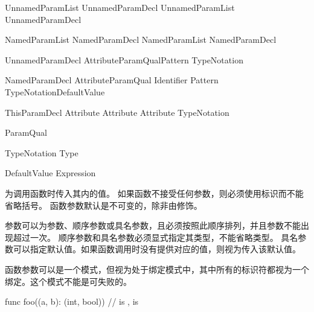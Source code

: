 \begin{bnf}{UnnamedParamList}
    UnnamedParamDecl \br
    UnnamedParamList \terminal{,} UnnamedParamDecl
\end{bnf}

\begin{bnf}{NamedParamList}
    NamedParamDecl \br
    NamedParamList \terminal{,} NamedParamDecl
\end{bnf}

\begin{bnf}{UnnamedParamDecl}
    Attribute\bnfs ParamQual\bnfq Pattern TypeNotation\bnfq
\end{bnf}

\begin{bnf}{NamedParamDecl}
    Attribute\bnfs ParamQual\bnfs \terminal{(} Identifier \terminal{)} Pattern TypeNotation\bnfq DefaultValue\bnfq
\end{bnf}

\begin{bnf}{ThisParamDecl}
    Attribute\bnfs {}\bnfq {} \br
    Attribute\bnfs \terminal{\&} \bnfq {} \br
    Attribute\bnfs {} TypeNotation
\end{bnf}

\begin{bnf}{ParamQual}
     \br
     \br
     \br
\end{bnf}

\begin{bnf}{TypeNotation}
    \terminal{:} Type
\end{bnf}

\begin{bnf}{DefaultValue}
    \terminal{=} Expression
\end{bnf}

\pnum
{}为调用函数时传入其内的值。
如果函数不接受任何参数，则必须使用\tcode{()}标识而不能省略括号。
函数参数默认是不可变的，除非由修饰。

\pnum
参数可以为参数、顺序参数或具名参数，且必须按照此顺序排列，并且参数不能出现超过一次。
顺序参数和具名参数必须显式指定其类型，不能省略类型。
具名参数可以指定默认值。如果函数调用时没有提供对应的值，则视为传入该默认值。

\pnum
函数参数可以是一个模式，但视为处于绑定模式中，其中所有的标识符都视为一个绑定。这个模式不能是可失败的。

\enterexample
\begin{codeblock}

func foo((a, b): (int, bool)) {
    //  is ,  is 
}

\end{codeblock}
\exitexample

